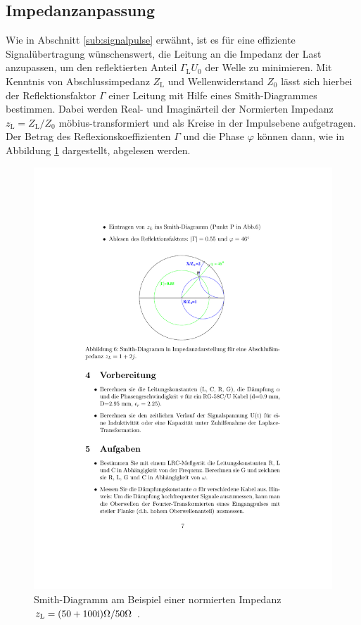 \subsection{Impedanzanpassung} %
\label{sub:impedanzanpassung}
Wie in Abschnitt \ref{sub:signalpulse} erwähnt, ist es für eine effiziente
Signalübertragung wünschenswert, die Leitung an die Impedanz der Last
anzupassen, um den reflektierten Anteil $\Gamma_\text{L}U_0$ der Welle zu
minimieren.
Mit Kenntnis von Abschlussimpedanz $Z_\text{L}$ und Wellenwiderstand $Z_0$
lässt sich hierbei der Reflektionsfaktor $\Gamma$ einer Leitung mit Hilfe
eines Smith-Diagrammes bestimmen.
Dabei werden Real- und Imaginärteil der Normierten Impedanz
$z_\text{L} = Z_\text{L}/Z_0$ möbius-transformiert und als Kreise in der
Impulsebene aufgetragen.
Der Betrag des Reflexionskoeffizienten $\Gamma$ und die Phase $\varphi$ können
dann, wie in Abbildung \ref{fig:smith} dargestellt, abgelesen werden.
\begin{figure}
    \centering
    \includegraphics[width=0.7\linewidth]{img/smith.pdf}
    \caption{
        Smith-Diagramm am Beispiel einer normierten Impedanz
        $z_\text{L} = (\num{50}+\num{100}\mathrm{i})\si{\ohm}/\num{50}\si{\ohm}$ \cite{E02}.
    }
    \label{fig:smith}
\end{figure}
